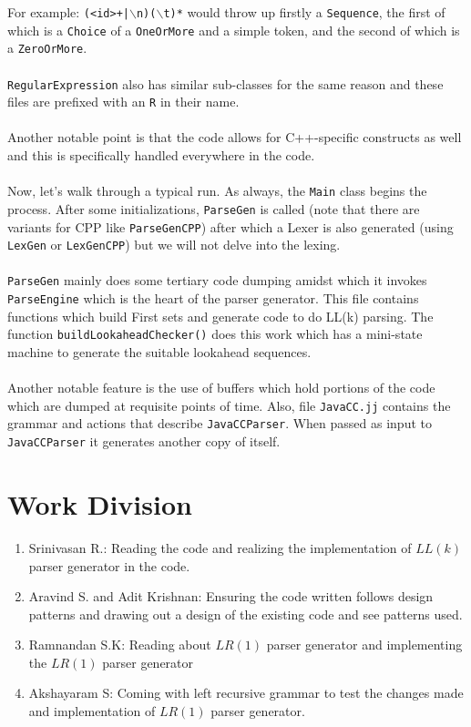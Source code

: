 \documentclass{article}
\begin{document}
\noindent For example: \texttt{(<id>+|$\backslash$n)($\backslash$t)*} would throw up firstly a \texttt{Sequence}, the first of which is a \texttt{Choice} of a \texttt{OneOrMore} and a simple token, and the second of which is a \texttt{ZeroOrMore}.\\\\\texttt{RegularExpression} also has similar sub-classes for the same reason and these files are prefixed with an \texttt{R} in their name.\\\\Another notable point is that the code allows for C++-specific constructs as well and this is specifically handled everywhere in the code.\\\\Now, let's walk through a typical run. As always, the \texttt{Main} class begins the process. After some initializations, \texttt{ParseGen} is called (note that there are variants for CPP like \texttt{ParseGenCPP}) after which a Lexer is also generated (using \texttt{LexGen} or \texttt{LexGenCPP}) but we will not delve into the lexing.\\\\\texttt{ParseGen} mainly does some tertiary code dumping amidst which it invokes \texttt{ParseEngine} which is the heart of the parser generator. This file contains functions which build First sets and generate code to do LL(k) parsing. The function \texttt{buildLookaheadChecker()} does this work which has a mini-state machine to generate the suitable lookahead sequences.\\\\Another notable feature is the use of buffers which hold portions of the code which are dumped at requisite points of time. Also, file \texttt{JavaCC.jj} contains the grammar and actions that describe \texttt{JavaCCParser}. When passed as input to \texttt{JavaCCParser} it generates another copy of itself.
\section{Work Division}
\begin{enumerate}
\item Srinivasan R.: Reading the code and realizing the implementation of $LL(k)$ parser generator in the code.
\item Aravind S. and Adit Krishnan: Ensuring the code written follows design patterns and drawing out a design of the existing code and see patterns used.
\item Ramnandan S.K: Reading about $LR(1)$ parser generator and implementing the $LR(1)$ parser generator
\item Akshayaram S: Coming with left recursive grammar to test the changes made and implementation of $LR(1)$ parser generator.  
\end{enumerate}
\end{document}
